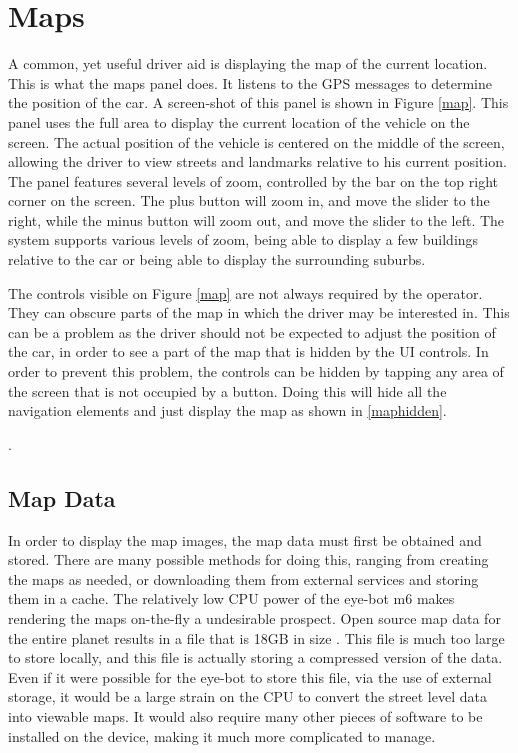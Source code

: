 

\section{Maps}

A common, yet useful driver aid is displaying the map of the current location. This is what the maps panel does. It listens to the GPS messages to determine the position of the car. A screen-shot of this panel is shown in Figure \ref{map}. This panel uses the full area to display the current location of the vehicle on the screen. The actual position of the vehicle is centered on the middle of the screen, allowing the driver to view streets and landmarks relative to his current position. The panel features several levels of zoom, controlled by the bar on the top right corner on the screen. The plus button will zoom in, and move the slider to the right, while the minus button will zoom out, and move the slider to the left. The system supports various levels of zoom, being able to display a few buildings relative to the car or being able to display the surrounding suburbs.


The controls visible on Figure \ref{map} are not always required by the operator. They can obscure parts of the map in which the driver may be interested in. This can be a problem as the driver should not be expected to adjust the position of the car, in order to see a part of the map that is hidden by the UI controls. In order to prevent this problem, the controls can be hidden by tapping any area of the screen that is not occupied by a button. Doing this will hide all the navigation elements and just display the map as shown in \ref{maphidden}.

.


\subsection{Map Data}

In order to display the map images, the map data must first be obtained and stored. There are many possible methods for doing this, ranging from creating the maps as needed, or downloading them from external services and storing them in a cache. The relatively low CPU power of the eye-bot m6 makes rendering the maps on-the-fly a undesirable prospect. Open source map data for the entire planet results in a file that is 18GB in size \cite{planet_osm}. This file is much too large to store locally, and this file is actually storing a compressed version of the data. Even if it were possible for the eye-bot to store this file, via the use of external storage, it would be a large strain on the CPU to convert the street level data into viewable maps. It would also require many other pieces of software to be installed on the device, making it much more complicated to manage.

